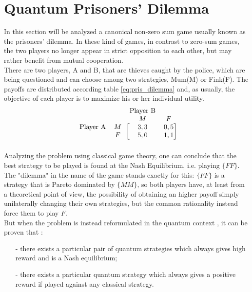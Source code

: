 \hfill

\section{Quantum Prisoners' Dilemma}
In this section will be analyzed a canonical non-zero sum game usually known as the prisoners' dilemma. In these kind of games, in contrast to zero-sum games, the two players no longer appear in strict opposition to each other, but may rather benefit from mutual cooperation. \\
There are two players, A and B, that are thieves caught by the police, which are being questioned and can choose among two strategies, Mum(M) or Fink(F). The payoffs are distributed according table \ref{eq:pris_dilemma} and, as usually, the objective of each player is to maximize his or her individual utility.
\begin{equation}
\begin{blockarray}{cccc}
& & \text{Player B}&\\
& & M & F\\
\begin{block}{cc[cc]}
\text{Player A} & M & 3,3 &  0,5 \\
 & F & 5,0 & 1,1 \\
\end{block}
\end{blockarray}
\label{eq:pris_dilemma}
\end{equation}
Analyzing the problem using classical game theory, one can conclude that the best strategy to be played is found at the Nash Equilibrium, i.e. playing $\{FF\}$. The "dilemma" in the name of the game stands exactly for this: $\{FF\}$ is a strategy that is Pareto dominated by $\{MM\}$, so both players have, at least from a theoretical point of view, the possibility of obtaining an higher payoff simply unilaterally changing their own strategies, but the common rationality instead force them to play $F$.\\
But when the problem is instead reformulated in the quantum context \cite{Eisert_1999}, it can be proven that :
\begin{itemize}[noitemsep]
	\item[-] there exists
a particular pair of quantum strategies which always gives high reward and is a Nash equilibrium;
	\item[-] there exists a particular quantum strategy which always gives a positive reward if played
against any classical strategy.
\end{itemize}

